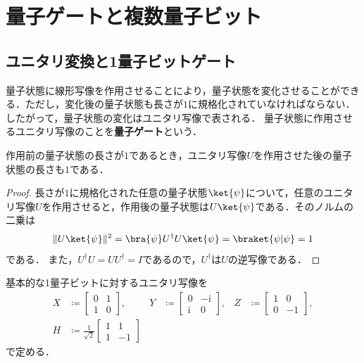 \section{量子ゲートと複数量子ビット}
\label{sec:gates-composite}

\subsection{ユニタリ変換と1量子ビットゲート}

量子状態に線形写像を作用させることにより，量子状態を変化させることができる．ただし，変化後の量子状態も長さが$1$に規格化されていなければならない．したがって，量子状態の変化はユニタリ写像で表される．
量子状態に作用させるユニタリ写像のことを\textbf{量子ゲート}という．



\begin{prop}
  作用前の量子状態の長さが$1$であるとき，ユニタリ写像$U$を作用させた後の量子状態の長さも$1$である．
\end{prop}
\begin{proof}
  長さが$1$に規格化された任意の量子状態$\ket{\psi}$について，任意のユニタリ写像$U$を作用させると，作用後の量子状態は$U\ket{\psi}$である．そのノルムの二乗は
  \[
    \lVert U\ket{\psi}\rVert^2
    =\bra{\psi}U^\dagger U\ket{\psi}
    =\braket{\psi|\psi} = 1
  \]
  である．
  また，$U^\dagger U=UU^\dagger=I$であるので，$U^\dagger$は$U$の逆写像である．
\end{proof}

\begin{defi}
  基本的な1量子ビットに対するユニタリ写像を
  \begin{align*}
    X & \coloneq\begin{bmatrix}0&1\\1&0\end{bmatrix},                    &
    Y & \coloneq\begin{bmatrix}0&-\mathrm{i}\\\mathrm{i}&0\end{bmatrix}, &
    Z & \coloneq\begin{bmatrix}1&0\\0&-1\end{bmatrix},                     \\
    H & \coloneq\frac1{\sqrt2}\begin{bmatrix}1&1\\1&-1\end{bmatrix}
  \end{align*}
  で定める．
\end{defi}

